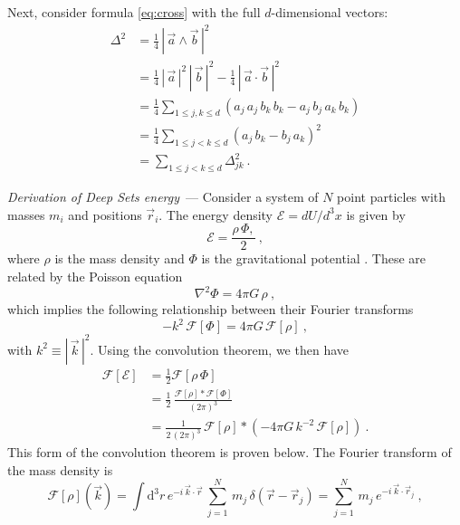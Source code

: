 \documentclass[10pt]{article}
\renewcommand{\paragraph}[1]{\par\addvspace{1.5ex}\noindent\textsl{#1}~---}
\renewcommand{\d}{\mathrm{d}}
\newcommand{\abs}[1]{|\,{#1}\,|}
\begin{document}
Next, consider formula \eqref{eq:cross} with the full $d$-dimensional vectors:
\begin{align}
    \Delta^2
    &= \frac{1}{4}\, \abs{\vec{a} \wedge \vec{b}}^2 \nonumber\\
    &= \frac{1}{4}\, \abs{\vec{a}}^2 \, \abs{\vec{b}}^2 - \frac{1}{4}\, \abs{\vec{a} \cdot \vec{b}}^2 \nonumber\\
    &= \frac{1}{4} \sum_{1 \leq j, k \leq d}
        ( a_j \, a_j \, b_k \, b_k - a_j \, b_j \, a_k \, b_k ) \nonumber\\
    &= \frac{1}{4} \sum_{1 \leq j < k \leq d}
        ( a_j \, b_k - b_j \, a_k )^2 \nonumber\\
    &= \sum_{1 \leq j < k \leq d} \Delta_{jk}^2~.
\end{align}


\paragraph{Derivation of Deep Sets energy} Consider a system of $N$ point particles with masses $m_i$ and positions $\vec{r}_i$.
The energy density $\mathcal{E} = d U / d^3 x$ is given by
\begin{equation}
    \mathcal{E} = \frac{\rho \, \Phi,}{2}~,
\end{equation}
where $\rho$ is the mass density and $\Phi$ is the gravitational potential \citep{LandauLifshitzFields}.
These are related by the Poisson equation
\begin{equation}
    \nabla^2 \Phi = 4 \pi G \, \rho~,
\end{equation}
which implies the following relationship between their Fourier transforms
\begin{equation}
    -k^2 \, \mathcal{F}[\Phi] = 4 \pi G \, \mathcal{F}[\rho]~,
\end{equation}
with $k^2 \equiv \abs{\vec{k}}^2$.
Using the convolution theorem, we then have
\begin{align}
    \mathcal{F}[\mathcal{E}] 
    &= \frac{1}{2} \mathcal{F}[\rho \, \Phi] \nonumber\\
    &= \frac{1}{2} \, \frac{\mathcal{F}[\rho] \ast \mathcal{F}[\Phi]}{(2\pi)^3} \nonumber\\
    &= \frac{1}{2 \, (2\pi)^3} \, \mathcal{F}[\rho] \ast \left(
        -4 \pi G \, k^{-2} \, \mathcal{F}[\rho]
    \right)~.
    \label{eq:ConvolutionThm}
\end{align}
This form of the convolution theorem is proven below.
The Fourier transform of the mass density is
\begin{equation}
    \mathcal{F}[\rho](\vec{k})
    = \int \d^3 r
        \, e^{-i \, \vec{k} \cdot \vec{r}}
        \, \sum_{j=1}^{N}
        \, m_j
        \, \delta(\vec{r} - \vec{r}_j)
    = \sum_{j=1}^{N} \, m_j \, e^{-i \, \vec{k} \cdot \vec{r}_j}~,
\end{equation}
\end{document}

